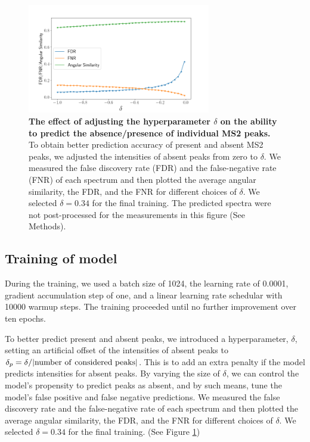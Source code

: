 \documentclass[10pt,a4paper]{article}
\begin{document}
\begin{figure}[htb!]
    \centering
    \includegraphics[width=8cm]{./img/compare_delta.png}
    \caption{{\bf The effect of adjusting the hyperparameter $\delta$ on the ability to predict the absence/presence of individual MS2 peaks.} To obtain better prediction accuracy of present and absent MS2 peaks, we adjusted the intensities of absent peaks from zero to $\delta$. We measured the false discovery rate (FDR) and the false-negative rate (FNR) of each spectrum and then plotted the average angular similarity, the FDR, and the FNR for different choices of $\delta$. We selected $\delta=0.34$ for the final training.  The predicted spectra were not post-processed for the measurements in this figure (See Methods). \label{fig:delta}}
\end{figure}
    
\subsection*{Training of model}

During the training, we used a batch size of 1024, the learning rate of 0.0001, gradient accumulation step of one, and a linear learning rate schedular with 10000 warmup steps. The training proceeded until no further improvement over ten epochs.

To better predict present and absent peaks, we introduced a hyperparameter, $\delta$, setting an artificial offset of the intensities of absent peaks to $\delta_p =\delta / |\rm{number\ of\ considered\ peaks}|$. This is to add an extra penalty if the model predicts intensities for absent peaks. By varying the size of $\delta$, we can control the model’s propensity to predict peaks as absent, and by such means, tune the model’s false positive and false negative predictions. We measured the false discovery rate and the false-negative rate of each spectrum and then plotted the average angular similarity, the FDR, and the FNR for different choices of $\delta$. We selected $\delta=0.34$ for the final training. (See Figure \ref{fig:delta})
\end{document}
